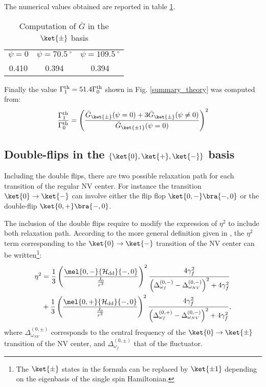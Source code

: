 \documentclass[a4paper, 11pt]{report}
\begin{document}
The numerical values obtained are reported in table \ref{table G flip-flop non mag}.
\begin{table}[htbp]
\centering
\caption{Computation of $\bar G$ in the $\ket{\pm}$ basis}
 \label{table G flip-flop non mag}
\begin{tabular}{c|c|c}
\toprule
$\psi=0$ & $\psi=70.5 \ ^\circ$ & $\psi=109.5 \ ^\circ$ \\

0.410 & 0.394 & 0.394 \\
\bottomrule
\end{tabular}
\end{table}

Finally the value $\Gamma_1^{\rm th}= 51.4 \Gamma_0^{\rm th}$ shown in Fig. \ref{summary_theory} was computed from:
\begin{equation}
\frac{\Gamma_1^{\rm th}}{\Gamma_0^{\rm th}}=\left(\frac{\bar G_{\ket{\pm}}(\psi=0) + 3 \bar G_{\ket{\pm}}(\psi\neq 0) }{\bar G_{\ket{\pm 1}}(\psi=0)}\right)^2
\end{equation}
\subsection{Double-flips in the $\{ \ket{0}, \ket{+}, \ket{-}\}$ basis}
Including the double flips, there are two possible relaxation path for each transition of the regular NV center. For instance the transition $\ket{0} \to \ket{-}$ can involve either the flip flop $\ket{0,-} \bra{-,0}$ or the double-flip $\ket{0,+} \bra{-,0}$.

The inclusion of the double flips require to modify the  expression of $\eta^2$ to include both relaxation path. According to the more general definition given in \citep{choi2017depolarization}, the $\eta^2$ term corresponding to the $\ket{0} \to \ket{-}$ transition of the NV center can be written\footnote{The $\ket{\pm}$ states in the formula can be replaced by $\ket{\pm 1}$ depending on the eigenbasis of the single spin Hamiltonian.}:
\begin{align}
\label{eq eta2 avec DQ}
\eta^2&=\frac{1}{3} \left(\frac{\mel{0,-}{\mathcal{H_{\rm dd}}}{-,0}}{\frac{J_0}{r^3}}\right)^2 \frac{4\gamma_f^2}{\left(\Delta_{\omega_f}^{(0,-)} - \Delta_{\omega_{NV}}^{(0,-)}\right)^2+4\gamma_f^2} \nonumber\\
&+\frac{1}{3} \left(\frac{\mel{0,+}{\mathcal{H_{\rm dd}}}{-,0}}{\frac{J_0}{r^3}}\right)^2 \frac{4\gamma_f^2}{\left(\Delta_{\omega_f}^{(0,+)} - \Delta_{\omega_{NV}}^{(0,-)}\right)^2+4\gamma_f^2},
\end{align}
where $\Delta_{\omega_{NV}}^{(0,\pm)}$ corresponds to the central frequency of the $\ket{0} \to \ket{\pm}$ transition of the NV center, and $\Delta_{\omega_{f}}^{(0,\pm)}$ that of the fluctuator.
\end{document}
